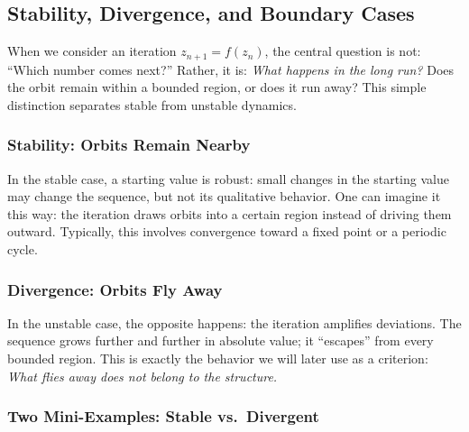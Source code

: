 
\subsection{Stability, Divergence, and Boundary Cases}


When we consider an iteration $z_{n+1}=f(z_n)$, the central question is not:
``Which number comes next?''
Rather, it is:
\emph{What happens in the long run?}
Does the orbit remain within a bounded region, or does it run away?
This simple distinction separates stable from unstable dynamics.

\subsubsection*{Stability: Orbits Remain Nearby}

In the stable case, a starting value is robust:
small changes in the starting value may change the sequence,
but not its qualitative behavior.
One can imagine it this way:
the iteration draws orbits into a certain region
instead of driving them outward.
Typically, this involves convergence toward a fixed point or a periodic cycle.

\subsubsection*{Divergence: Orbits Fly Away}

In the unstable case, the opposite happens:
the iteration amplifies deviations.
The sequence grows further and further in absolute value;
it ``escapes'' from every bounded region.
This is exactly the behavior we will later use as a criterion:
\emph{What flies away does not belong to the structure.}

\subsubsection*{Two Mini-Examples: Stable vs.\ Divergent}

